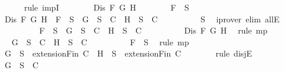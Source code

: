 \begin{isabellebody}
\ \ \ \ \isamarkupfalse%
\ {\isacharparenleft}rule\ impI{\isacharparenright}{\isacharplus}\isanewline
\ \ \ \ \ \ \isamarkupfalse%
\ {\isachardoublequoteopen}Dis\ F\ G\ H{\isachardoublequoteclose}\isanewline
\ \ \ \ \ \ \isamarkupfalse%
\ {\isachardoublequoteopen}F\ {\isasymin}\ S{\isachardoublequoteclose}\ \isanewline
\ \ \ \ \ \ \isamarkupfalse%
\ {\isachardoublequoteopen}Dis\ F\ G\ H\ {\isasymlongrightarrow}\ F\ {\isasymin}\ S\ {\isasymlongrightarrow}\ {\isacharbraceleft}G{\isacharbraceright}\ {\isasymunion}\ S\ {\isasymin}\ C\ {\isasymor}\ {\isacharbraceleft}H{\isacharbraceright}\ {\isasymunion}\ S\ {\isasymin}\ C{\isachardoublequoteclose}\isanewline
\ \ \ \ \ \ \ \ \isamarkupfalse%
\ S{}\ \isamarkupfalse%
\ {\isacharparenleft}iprover\ elim{\isacharcolon}\ allE{\isacharparenright}\isanewline
\ \ \ \ \ \ \isamarkupfalse%
\ \isamarkupfalse%
\ {\isachardoublequoteopen}F\ {\isasymin}\ S\ {\isasymlongrightarrow}\ {\isacharbraceleft}G{\isacharbraceright}\ {\isasymunion}\ S\ {\isasymin}\ C\ {\isasymor}\ {\isacharbraceleft}H{\isacharbraceright}\ {\isasymunion}\ S\ {\isasymin}\ C{\isachardoublequoteclose}\isanewline
\ \ \ \ \ \ \ \ \isamarkupfalse%
\ {\isacartoucheopen}Dis\ F\ G\ H{\isacartoucheclose}\ \isamarkupfalse%
\ {\isacharparenleft}rule\ mp{\isacharparenright}\isanewline
\ \ \ \ \ \ \isamarkupfalse%
\ \isamarkupfalse%
\ {\isachardoublequoteopen}{\isacharbraceleft}G{\isacharbraceright}\ {\isasymunion}\ S\ {\isasymin}\ C\ {\isasymor}\ {\isacharbraceleft}H{\isacharbraceright}\ {\isasymunion}\ S\ {\isasymin}\ C{\isachardoublequoteclose}\isanewline
\ \ \ \ \ \ \ \ \isamarkupfalse%
\ {\isacartoucheopen}F\ {\isasymin}\ S{\isacartoucheclose}\ \isamarkupfalse%
\ {\isacharparenleft}rule\ mp{\isacharparenright}\isanewline
\ \ \ \ \ \ \isamarkupfalse%
\ {\isachardoublequoteopen}{\isacharbraceleft}G{\isacharbraceright}\ {\isasymunion}\ S\ {\isasymin}\ {\isacharparenleft}extensionFin\ C{\isacharparenright}\ {\isasymor}\ {\isacharbraceleft}H{\isacharbraceright}\ {\isasymunion}\ S\ {\isasymin}\ {\isacharparenleft}extensionFin\ C{\isacharparenright}{\isachardoublequoteclose}\isanewline
\ \ \ \ \ \ \isamarkupfalse%
\ {\isacharparenleft}rule\ disjE{\isacharparenright}\isanewline
\ \ \ \ \ \ \ \ \isamarkupfalse%
\ {\isachardoublequoteopen}{\isacharbraceleft}G{\isacharbraceright}\ {\isasymunion}\ S\ {\isasymin}\ C{\isachardoublequoteclose}\isanewline

\end{isabellebody}
